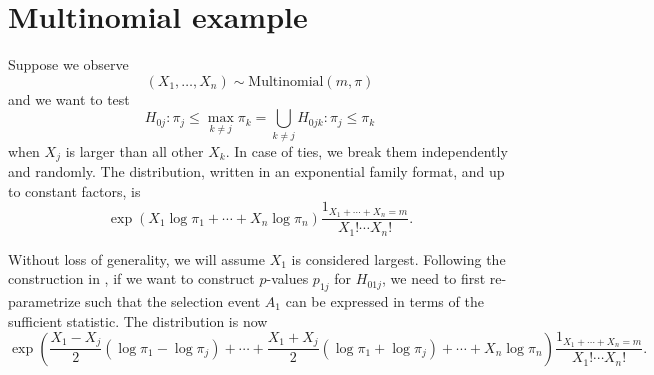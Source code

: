 \documentclass[11pt]{article}
\begin{document}
\section{Multinomial example}
\label{sec:multinomial_example}

Suppose we observe
$$\left(X_1, \ldots, X_n\right) \sim \text{Multinomial}\left(m, \pi\right)$$
and we want to test
$$H_{0j}: \pi_j \le \max_{k \ne j} \pi_k = \bigcup_{k \ne j} H_{0jk}: \pi_j \le \pi_k$$
when $X_j$ is larger than all other $X_k$. In case of ties, we break them independently and randomly. The distribution, written in an exponential family format, and up to constant factors, is
$$\exp\left(X_1 \log \pi_1 + \cdots + X_n \log \pi_n\right) \frac{1_{X_1 + \cdots + X_n = m}}{X_1! \cdots X_n!}.$$

Without loss of generality, we will assume $X_1$ is considered largest. Following the construction in \cite{Fithian:2014ws}, if we want to construct $p$-values $p_{1j}$ for $H_{01j}$, we need to first re-parametrize such that the selection event $A_1$ can be expressed in terms of the sufficient statistic. The distribution is now
$$\exp\left(\frac{X_1 - X_j}{2} \left(\log \pi_1 - \log \pi_j\right) + \cdots + \frac{X_1 + X_j}{2} \left(\log \pi_1 + \log \pi_j\right) + \cdots + X_n \log \pi_n\right) \frac{1_{X_1 + \cdots + X_n = m}}{X_1! \cdots X_n!}.$$
\end{document}
